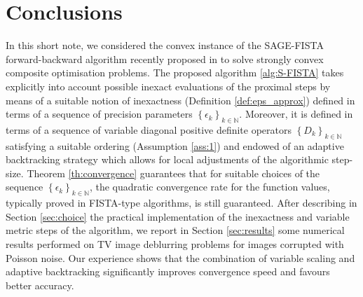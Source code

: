 \documentclass[conference]{IEEEtran}
\begin{document}
\section{Conclusions}

In this short note, we considered the convex instance of the SAGE-FISTA forward-backward algorithm recently proposed in \cite{SAGE-FISTA} to solve strongly convex composite optimisation problems. The proposed algorithm \ref{alg:S-FISTA} takes explicitly into account possible inexact evaluations of the proximal steps by means of a suitable notion of inexactness (Definition \ref{def:eps_approx}) defined in terms of a sequence of precision parameters $\left\{ \epsilon_k\right\}_{k\in\mathbb{N}}$. Moreover, it is defined in terms of a sequence of variable diagonal positive definite operators $\left\{ D_k\right\}_{k\in\mathbb{N}}$ satisfying a suitable ordering (Assumption \ref{ass:1}) and endowed of an adaptive backtracking strategy which allows for local adjustments of the algorithmic step-size. Theorem \ref{th:convergence} guarantees that for suitable choices of the sequence $\left\{ \epsilon_k\right\}_{k\in\mathbb{N}}$, the quadratic convergence rate for the function values, typically proved in FISTA-type algorithms, is still guaranteed. After describing in Section \ref{sec:choice} the practical implementation of the inexactness and variable metric steps of the algorithm, we report in Section \ref{sec:results} some numerical results performed on TV image deblurring problems for images corrupted with Poisson noise. Our experience shows that the combination of variable scaling and adaptive backtracking significantly improves convergence speed and favours better accuracy.




\end{document}
